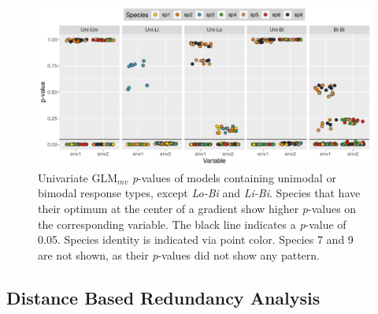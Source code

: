 		\begin{figure}[h!]
			\centering
			\includegraphics[width=0.9\linewidth]{../02_Figures/glm_uni_hohep}
			\caption{
				Univariate GLM$_{mv}$ \textit{p}-values of models containing unimodal or bimodal response types, except \textit{Lo-Bi} and \textit{Li-Bi}. Species that have their optimum at the center of a gradient show higher \textit{p}-values on the corresponding variable. 
				The black line indicates a \textit{p}-value of 0.05. Species identity is indicated via point color.
				Species 7 and 9 are not shown, as their \textit{p}-values did not show any pattern.
				}
			\label{fig:hohep}
		\end{figure}


	\subsection{Distance Based Redundancy Analysis}

